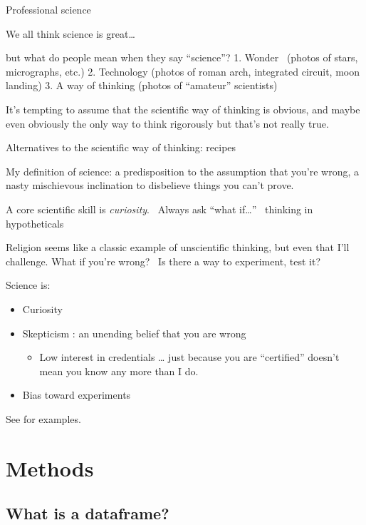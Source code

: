\documentclass[
]{book}
\providecommand{\tightlist}{%
  \setlength{\itemsep}{0pt}\setlength{\parskip}{0pt}}
\begin{document}
Professional science

We all think science is great\ldots{}

but what do people mean when they say ``science''?
1. Wonder ~(photos of stars, micrographs, etc.)
2. Technology (photos of roman arch, integrated circuit, moon landing)
3. A way of thinking (photos of ``amateur'' scientists)

It's tempting to assume that the scientific way of thinking is obvious, and maybe even obviously the only way to think rigorously but that's not really true.

Alternatives to the scientific way of thinking:
recipes

My definition of science: a predisposition to the assumption that you're wrong, a nasty mischievous inclination to disbelieve things you can't prove.

A core scientific skill is \emph{curiosity}. ~Always ask ``what if\ldots{}'' ~thinking in hypotheticals

Religion seems like a classic example of unscientific thinking, but even that I'll challenge. What if you're wrong? ~Is there a way to experiment, test it?

Science is:

\begin{itemize}
\tightlist
\item
  Curiosity
\item
  Skepticism : an unending belief that you are wrong

  \begin{itemize}
  \tightlist
  \item
    Low interest in credentials \ldots{} just because you are ``certified'' doesn't mean you know any more than I do.
  \end{itemize}
\item
  Bias toward experiments
\end{itemize}

See \citet{roberts_self-experimentation_2004} for examples.

\hypertarget{methods}{%
\chapter{Methods}\label{methods}}

\hypertarget{what-is-a-dataframe}{%
\section{What is a dataframe?}\label{what-is-a-dataframe}}
\end{document}
